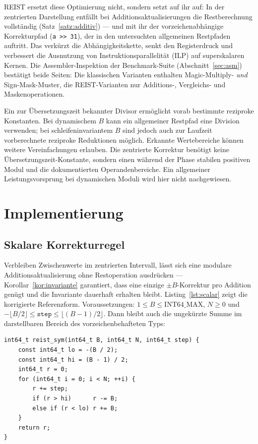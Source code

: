 \documentclass[11pt,a4paper]{scrartcl}
\theoremstyle{definition}
\theoremstyle{plain}
\theoremstyle{remark}
\begin{document}
REIST ersetzt diese Optimierung nicht, sondern setzt auf ihr auf: In der zentrierten Darstellung entfällt bei Additionsaktualisierungen die Restberechnung vollständig (Satz~\ref{satz:additiv}) --- und mit ihr der vorzeichenabhängige Korrekturpfad (\texttt{a >> 31}), der in den untersuchten allgemeinen Restpfaden auftritt. Das verkürzt die Abhängigkeitskette, senkt den Registerdruck und verbessert die Ausnutzung von Instruktionsparallelität (ILP) auf superskalaren Kernen. Die Assembler-Inspektion der Benchmark-Suite (Abschnitt~\ref{sec:asm}) bestätigt beide Seiten: Die klassischen Varianten enthalten Magic-Multiply- \emph{und} Sign-Mask-Muster, die REIST-Varianten nur Additions-, Vergleichs- und Maskenoperationen.

Ein zur Übersetzungszeit bekannter Divisor ermöglicht vorab bestimmte reziproke Konstanten. Bei dynamischem $B$ kann ein allgemeiner Restpfad eine Division verwenden; bei schleifeninvariantem $B$ sind jedoch auch zur Laufzeit vorberechnete reziproke Reduktionen möglich. Erkannte Wertebereiche können weitere Vereinfachungen erlauben. Die zentrierte Korrektur benötigt keine Übersetzungszeit-Konstante, sondern einen während der Phase stabilen positiven Modul und die dokumentierten Operandenbereiche. Ein allgemeiner Leistungsvorsprung bei dynamischen Moduli wird hier nicht nachgewiesen.

\section{Implementierung}
\label{sec:implementierung}

\subsection{Skalare Korrekturregel}

Verbleiben Zwischenwerte im zentrierten Intervall, lässt sich eine modulare Additionsaktualisierung ohne Restoperation ausdrücken --- Korollar~\ref{kor:invariante} garantiert, dass eine einzige $\pm B$-Korrektur pro Addition genügt und die Invariante dauerhaft erhalten bleibt. Listing~\ref{lst:scalar} zeigt die korrigierte Referenzform. Voraussetzungen: $1\le B\le\mathrm{INT64\_MAX}$, $N\ge0$ und $-\lfloor B/2\rfloor\le\mathtt{step}\le\lfloor(B-1)/2\rfloor$. Dann bleibt auch die ungekürzte Summe im darstellbaren Bereich des vorzeichenbehafteten Typs:

\noindent\begin{minipage}{\linewidth}
\begin{lstlisting}[caption={Korrigierte skalare Referenzform; keine neue Zeitmessung. Der Zustand $r$ verbleibt dauerhaft im zentrierten Intervall; pro Schritt fällt höchstens eine $\pm B$-Korrektur an.},label={lst:scalar}]
int64_t reist_sym(int64_t B, int64_t N, int64_t step) {
    const int64_t lo = -(B / 2);
    const int64_t hi = (B - 1) / 2;
    int64_t r = 0;
    for (int64_t i = 0; i < N; ++i) {
        r += step;
        if (r > hi)      r -= B;
        else if (r < lo) r += B;
    }
    return r;
}
\end{lstlisting}
\end{minipage}
\end{document}
